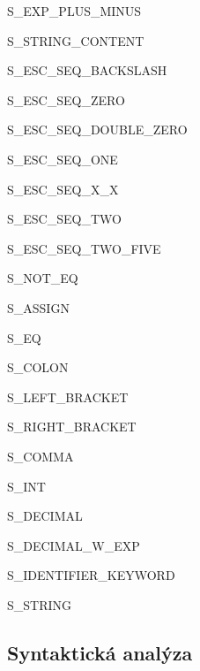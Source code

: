 \documentclass[a4paper, 12pt]{article}
\begin{document}
\begin{itemize}
\begin{minipage}{0.06\linewidth}
    \end{minipage}
    \begin{minipage}{0.4\linewidth}
        \vspace{0.55cm}
        \item[] S\_EXP\_PLUS\_MINUS
        \item[] S\_STRING\_CONTENT
        \item[] S\_ESC\_SEQ\_BACKSLASH
        \item[] S\_ESC\_SEQ\_ZERO
        \item[] S\_ESC\_SEQ\_DOUBLE\_ZERO
        \item[] S\_ESC\_SEQ\_ONE
        \item[] S\_ESC\_SEQ\_X\_X
        \item[] S\_ESC\_SEQ\_TWO
        \item[] S\_ESC\_SEQ\_TWO\_FIVE
        \vspace{4cm}
        \item[] S\_NOT\_EQ
        \item[] S\_ASSIGN
        \item[] S\_EQ
        \item[] S\_COLON
        \item[] S\_LEFT\_BRACKET
        \item[] S\_RIGHT\_BRACKET
        \item[] S\_COMMA
        \item[] S\_INT
        \item[] S\_DECIMAL
        \item[] S\_DECIMAL\_W\_EXP
        \item[] S\_IDENTIFIER\_KEYWORD
        \item[] S\_STRING
    \end{minipage}
\end{itemize}

\newpage

\subsection{Syntaktická analýza}
\end{document}
